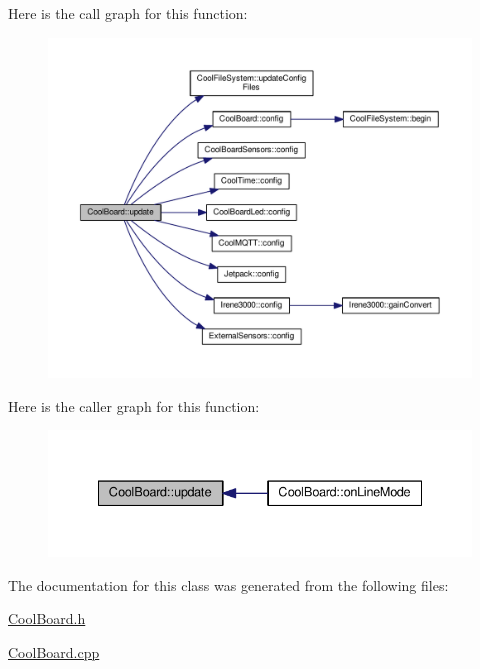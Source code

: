 Here is the call graph for this function\+:\nopagebreak
\begin{figure}[H]
\begin{center}
\leavevmode
\includegraphics[width=350pt]{class_cool_board_a8612756d3f73198cdde857a66f0fe690_cgraph}
\end{center}
\end{figure}
Here is the caller graph for this function\+:\nopagebreak
\begin{figure}[H]
\begin{center}
\leavevmode
\includegraphics[width=335pt]{class_cool_board_a8612756d3f73198cdde857a66f0fe690_icgraph}
\end{center}
\end{figure}


The documentation for this class was generated from the following files\+:\begin{DoxyCompactItemize}
\item 
\hyperlink{_cool_board_8h}{Cool\+Board.\+h}\item 
\hyperlink{_cool_board_8cpp}{Cool\+Board.\+cpp}\end{DoxyCompactItemize}
